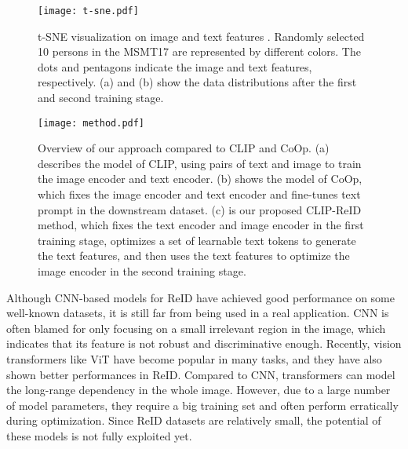 \documentclass[letterpaper]{article} \usepackage{aaai23}  \usepackage{times}  \usepackage{helvet}  \usepackage{courier}  \usepackage[hyphens]{url}  \usepackage{graphicx} \urlstyle{rm} \def\UrlFont{\rm}  \usepackage{natbib}  \usepackage{caption} \frenchspacing  \setlength{\pdfpagewidth}{8.5in}  \setlength{\pdfpageheight}{11in}  \usepackage{algorithm}
\begin{document}
\begin{figure}[t]
\centering
\texttt{[image: t-sne.pdf]}
\caption{t-SNE visualization on image and text features \cite{t-sne}. Randomly selected 10 persons in the MSMT17 are represented by different colors. The dots and pentagons indicate the image and text features, respectively. (a) and (b) show the data distributions after the first and second training stage.
}
\label{fg:t-sne}
\end{figure}

\begin{figure*}[t]
\centering
\texttt{[image: method.pdf]}
\caption{Overview of our approach compared to CLIP and CoOp. (a) describes the model of CLIP, using pairs of text and image to train the image encoder and text encoder. (b) shows the model of CoOp, which fixes the image encoder and text encoder and fine-tunes text prompt in the downstream dataset. (c) is our proposed CLIP-ReID method, which fixes the text encoder and image encoder in the first training stage, optimizes a set of learnable text tokens to generate the text features, and then uses the text features to optimize the image encoder in the second training stage.}
\label{fg:method}
\end{figure*}

Although CNN-based models for ReID have achieved good performance on some well-known datasets, it is still far from being used in a real application. CNN is often blamed for only focusing on a small irrelevant region in the image, which indicates that its feature is not robust and discriminative enough. Recently, vision transformers like ViT \cite{ViT} have become popular in many tasks, and they have also shown better performances in ReID. Compared to CNN, transformers can model the long-range dependency in the whole image. However, due to a large number of model parameters, they require a big training set and often perform erratically during optimization. Since ReID datasets are relatively small, the potential of these models is not fully exploited yet. 
\end{document}
